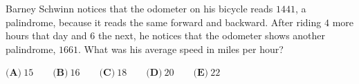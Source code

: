 Barney Schwinn notices that the odometer on his bicycle reads $1441$, a palindrome, because it reads the same forward and backward. After riding $4$ more hours that day and $6$ the next, he notices that the odometer shows another palindrome, $1661$. What was his average speed in miles per hour?



$\textbf{(A)}\ 15\qquad
\textbf{(B)}\ 16\qquad
\textbf{(C)}\ 18\qquad
\textbf{(D)}\ 20\qquad
\textbf{(E)}\ 22$
